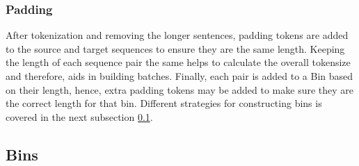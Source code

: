\documentclass[12pt,a4paper,twoside,openright]{report}
\begin{document}
\subsubsection{Padding}
After tokenization and removing the longer sentences, padding tokens are added to the source and target sequences to ensure they are the same length. Keeping the length of each sequence pair the same helps to calculate the overall tokensize and therefore, aids in building batches.
Finally, each pair is added to a Bin based on their length, hence, extra padding tokens may be added to make sure they are the correct length for that bin. Different strategies for constructing bins is covered in the next subsection \ref{bins}.





\subsection{Bins}
\label{bins}

\begin{table}[]
\centering
\resizebox{0.7\textwidth}{!}{%
\begin{tabular}{p{2cm}p{2cm}p{2cm}p{2cm}p{2cm}}
\toprule
\multirow{2}{*}{Tokensize} & \multirow{2}{*}{Raw} & \multicolumn{3}{c}{Effective} \\
\cmidrule(l){3-5}
&   & na\"ive    & big      & small  \\
\midrule \midrule
1024 & 14.4k & 1.5k & 7.4k & 13.4k   \\
2048 & 14.5k & 1.4k & 7.1k & 13.6k   \\
3072 & 15k & 1.5k & 7.4k & 14k \\
4096 & \textbf{15.5k} & 1.4k & 7.3k & \textbf{14.4k} \\
\bottomrule
\end{tabular}}
\caption{The \textbf{Raw} and \textbf{Effective} throughput for different tokensizes and batching%
}
\label{table:raw-and-effective-throughpu}
\end{table}
\end{document}
